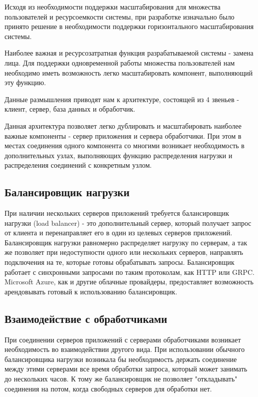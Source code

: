 Исходя из необходимости поддержки масштабирования для множества пользователей и ресурсоемкости системы, при разработке изначально было принято решение в необходимости поддержки горизонтального масштабирования системы.

Наиболее важная и ресурсозатратная функция разрабатываемой системы - замена лица. Для поддержки одновременной работы множества пользователей нам необходимо иметь возможность легко масштабировать компонент, выполняющий эту функцию.

Данные размышления приводят нам к архитектуре, состоящей из 4 звеньев - клиент, сервер, база данных и обработчик.


Данная архитектура позволяет легко дублировать и масштабировать наиболее важные компоненты - сервер приложения и сервера обработчики. При этом в местах соединения одного компонента со многими возникает необходимость в дополнительных узлах, выполняющих функцию распределения нагрузки и распределения соединений с конкретным узлом.

\subsection{Балансировщик нагрузки}

При наличии нескольких серверов приложений требуется балансировщик нагрузки (load balancer) - это дополнительный сервер, который получает запрос от клиента и перенаправляет его в один из целевых серверов приложений. Балансировщик нагрузки равномерно распределяет нагрузку по серверам, а так же позволяет при недоступности одного или нескольких серверов, направлять подключения на те, которые готовы обрабатывать запросы. Балансировщик работает с синхронными запросами по таким протоколам, как HTTP или GRPC. Microsoft Azure, как и другие облачные провайдеры, предоставляет возможность арендовывать готовый к использованию балансировщик.

\subsection{Взаимодействие с обработчиками}

При соединении серверов приложений с серверами обработчиками возникает необходимость во взаимодействии другого вида. При использовании обычного балансировщика нагрузки возникала бы необходимость держать соединение между этими серверами все время обработки запроса, который может занимать до нескольких часов. К тому же балансировщик не позволяет "откладывать" соединения на потом, когда свободных серверов для обработки нет.

